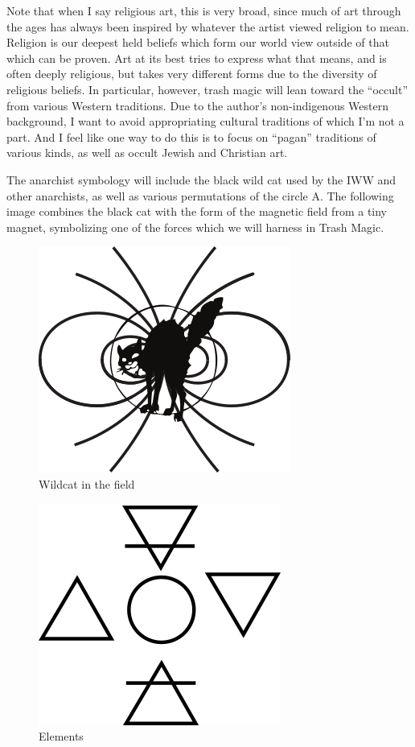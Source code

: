 Note that when I say religious art, this is very broad, since much of
art through the ages has always been inspired by whatever the artist
viewed religion to mean. Religion is our deepest held beliefs which form
our world view outside of that which can be proven. Art at its best
tries to express what that means, and is often deeply religious, but
takes very different forms due to the diversity of religious beliefs. In
particular, however, trash magic will lean toward the ``occult'' from
various Western traditions. Due to the author's non-indigenous Western
background, I want to avoid appropriating cultural traditions of which
I'm not a part. And I feel like one way to do this is to focus on
``pagan'' traditions of various kinds, as well as occult Jewish and
Christian art.

The anarchist symbology will include the black wild cat used by the IWW
and other anarchists, as well as various permutations of the circle A.
The following image combines the black cat with the form of the magnetic
field from a tiny magnet, symbolizing one of the forces which we will
harness in Trash Magic.

\begin{figure}[htbp]
\centering
\includegraphics{images/cat3.png}
\caption{Wildcat in the field}
\end{figure}

\begin{figure}[htbp]
\centering
\includegraphics{images/elements.png}
\caption{Elements}
\end{figure}

